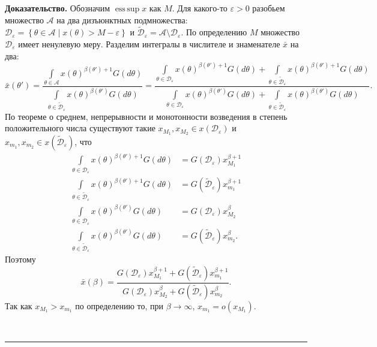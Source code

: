 \documentclass[12pt]{article}
\newenvironment{proof}[1][Доказательство]{\noindent\textbf{#1.} }{\ \rule{0.5em}{0.5em}}
\DeclareMathOperator*{\esssup}{ess\,sup}
\begin{document}
\begin{proof}
Обозначим $\esssup x$ как $M$.   Для какого-то $\varepsilon > 0$ разобьем множество $\mathcal{A}$ на два дизъюнктных подмножества: 
$\mathcal{D}_\varepsilon = \left\{ \theta \in \mathcal{A} \mid x(\theta) > M - \varepsilon \right\}$
и 
$ \widetilde{\mathcal{D}}_\varepsilon = \mathcal{A} \setminus \mathcal{D}_\varepsilon.$
По определению $M$ множество $\mathcal{D}_\varepsilon$ имеет ненулевую меру.
Разделим интегралы в числителе и знаменателе $\bar{x}$ на два:
\begin{equation*}
\bar{x}(\theta') = 
\frac{\int\limits_{\theta \in \mathcal{A}}x(\theta)^{\beta(\theta')+1}G(d \theta)}{\int\limits_{\theta \in \widetilde{\mathcal{D}}_\varepsilon} x(\theta)^{\beta(\theta')}G(d \theta)} = 
\frac{\int\limits_{\theta \in \mathcal{D}_\varepsilon}x(\theta)^{\beta(\theta')+1}G(d \theta) + \int\limits_{\theta \in \widetilde{\mathcal{D}}_\varepsilon}x(\theta)^{\beta(\theta')+1}G(d \theta)}{\int\limits_{\theta \in \mathcal{D}_\varepsilon} x(\theta)^{\beta(\theta')}G(d \theta) + \int\limits_{\theta \in \widetilde{\mathcal{D}}_\varepsilon} x(\theta)^{\beta(\theta')}G(d \theta)}.
\end{equation*}
По теореме о среднем,  непрерывности и монотонности возведения в степень положительного числа существуют такие $x_{M_1},  x_{M_2} \in x(\mathcal{D}_\varepsilon)$ и $x_{m_1}, x_{m_2} \in x(\widetilde{\mathcal{D}}_\varepsilon)$,  что
\begin{align*}
\int\limits_{\theta \in \mathcal{D}_\varepsilon}x(\theta)^{\beta(\theta')+1}G(d \theta) &= G(\mathcal{D}_\varepsilon) x_{M_1}^{\beta + 1}  \\
\int\limits_{\theta \in \widetilde{\mathcal{D}}_\varepsilon}x(\theta)^{\beta(\theta')+1}G(d \theta) &= G(\widetilde{\mathcal{D}}_\varepsilon) x_{m_1}^{\beta+1}\\
\int\limits_{\theta \in \mathcal{D}_\varepsilon}x(\theta)^{\beta(\theta')}G(d \theta) &= G(\mathcal{D}_\varepsilon) x_{M_2}^{\beta}  \\
\int\limits_{\theta \in \widetilde{\mathcal{D}}_\varepsilon}x(\theta)^{\beta(\theta')}G(d \theta) &= G(\widetilde{\mathcal{D}}_\varepsilon) x_{m_2}^{\beta}.
\end{align*}
Поэтому 
\begin{equation*}
\bar{x}(\beta) = \frac{G(\mathcal{D}_\varepsilon) x_{M_1}^{\beta + 1} + G(\widetilde{\mathcal{D}}_\varepsilon) x_{m_1}^{\beta+1}}{G(\mathcal{D}_\varepsilon) x_{M_2}^{\beta} + G(\widetilde{\mathcal{D}}_\varepsilon) x_{m_2}^{\beta}}.
\end{equation*}
Так как $x_{M_1} > x_{m_1}$ по определению то,  при $\beta \to \infty$,  $x_{m_1} = o(x_{M_1}). $ 

\end{proof}
\end{document}
